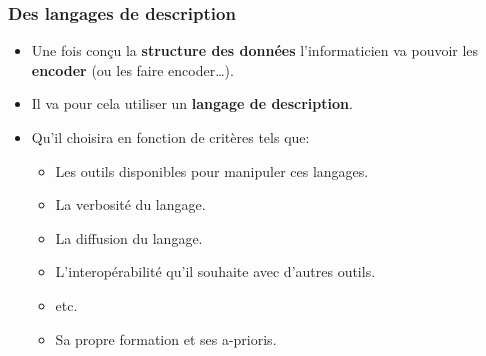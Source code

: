 \subsubsection{Des langages de description}

\begin{slide}
	\begin{itemize}
		\item Une fois conçu la \textbf{structure des données} l'informaticien va pouvoir les \textbf{encoder} (ou les faire encoder…).
		\item Il va pour cela utiliser un \textbf{langage de description}.
		\item Qu'il choisira en fonction de critères tels que:
			\begin{itemize}
				\item Les outils disponibles pour manipuler ces langages.
				\item La verbosité du langage.
				\item La diffusion du langage.
				\item L'interopérabilité qu'il souhaite avec d'autres outils.
				\item etc.
				\item Sa propre formation et ses a-prioris.
			\end{itemize}
	\end{itemize}
\end{slide}

\begin{slide}

		\beamerdefaultoverlayspecification{}

		
		
\end{slide}

